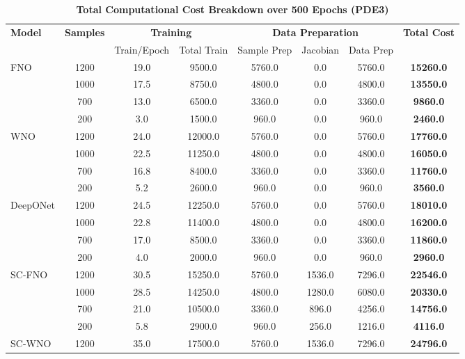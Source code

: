 




\begin{table}[htbp]
\centering
\caption{\textbf{Total Computational Cost Breakdown over 500 Epochs (PDE3)}}
\label{tab:PDE3_total_computational_cost}
\scriptsize
\setlength{\tabcolsep}{3pt}
\begin{tabular}{l|c|cc|ccc|c}
\hline
\textbf{Model} & \textbf{Samples} & \multicolumn{2}{c|}{\textbf{Training}} & \multicolumn{3}{c|}{\textbf{Data Preparation}} & \textbf{Total Cost} \\
& & Train/Epoch & Total Train & Sample Prep & Jacobian & Data Prep &  \\
\hline
FNO & 1200 & 19.0 & 9500.0 & 5760.0 & 0.0 & 5760.0 & \textbf{15260.0} \\
    & 1000 & 17.5 & 8750.0 & 4800.0 & 0.0 & 4800.0 & \textbf{13550.0} \\
    & 700  & 13.0 & 6500.0 & 3360.0 & 0.0 & 3360.0 & \textbf{9860.0}  \\
    & 200  & 3.0  & 1500.0 & 960.0  & 0.0 & 960.0  & \textbf{2460.0}  \\
\hline
WNO & 1200 & 24.0 & 12000.0 & 5760.0 & 0.0 & 5760.0 & \textbf{17760.0} \\
    & 1000 & 22.5 & 11250.0 & 4800.0 & 0.0 & 4800.0 & \textbf{16050.0} \\
    & 700  & 16.8 & 8400.0  & 3360.0 & 0.0 & 3360.0 & \textbf{11760.0} \\
    & 200  & 5.2  & 2600.0  & 960.0  & 0.0 & 960.0  & \textbf{3560.0}  \\
\hline
DeepONet & 1200 & 24.5 & 12250.0 & 5760.0 & 0.0 & 5760.0 & \textbf{18010.0} \\
         & 1000 & 22.8 & 11400.0 & 4800.0 & 0.0 & 4800.0 & \textbf{16200.0} \\
         & 700  & 17.0 & 8500.0  & 3360.0 & 0.0 & 3360.0 & \textbf{11860.0} \\
         & 200  & 4.0  & 2000.0  & 960.0  & 0.0 & 960.0  & \textbf{2960.0}  \\
\hline
SC-FNO & 1200 & 30.5 & 15250.0 & 5760.0 & 1536.0 & 7296.0 & \textbf{22546.0} \\
       & 1000 & 28.5 & 14250.0 & 4800.0 & 1280.0 & 6080.0 & \textbf{20330.0} \\
       & 700  & 21.0 & 10500.0 & 3360.0 & 896.0  & 4256.0 & \textbf{14756.0} \\
       & 200  & 5.8  & 2900.0  & 960.0  & 256.0  & 1216.0 & \textbf{4116.0}  \\
\hline
SC-WNO & 1200 & 35.0 & 17500.0 & 5760.0 & 1536.0 & 7296.0 & \textbf{24796.0} \\

\end{tabular}
\end{table}

